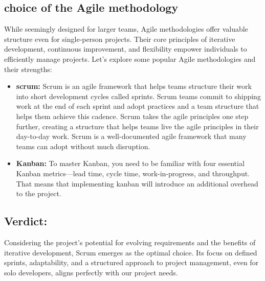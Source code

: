\subsection*{choice of the Agile methodology}
While seemingly designed for larger teams, Agile methodologies\cite{webArticle0} offer valuable structure even for single-person projects. Their core principles of iterative development, continuous improvement, and flexibility empower individuals to efficiently manage projects.
Let's explore some popular Agile methodologies and their strengths:
\begin{itemize}
    \item \textbf{scrum:} Scrum is an agile framework that helps teams structure their work into short development cycles called sprints. Scrum teams commit to shipping work at the end of each sprint and adopt practices and a team structure that helps them achieve this cadence. Scrum takes the agile principles one step further, creating a structure that helps teams live the agile principles in their day-to-day work. Scrum is a well-documented agile framework that many teams can adopt without much disruption.
    \item \textbf{Kanban:} To master Kanban, you need to be familiar with four essential Kanban metrics—lead time, cycle time, work-in-progress, and throughput. That means that implementing kanban will introduce an additional overhead to the project.
\end{itemize}
\subsection*{Verdict:}
Considering the project's potential for evolving requirements and the benefits of iterative development, Scrum emerges as the optimal choice. Its focus on defined sprints, adaptability, and a structured approach to project management, even for solo developers, aligns perfectly with our project needs.

